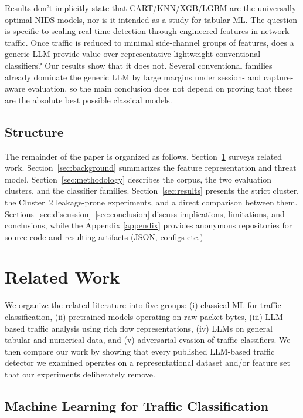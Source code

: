 \documentclass[conference]{IEEEtran}
\begin{document}
Results don't implicitly state that CART/KNN/XGB/LGBM are the universally optimal NIDS models, nor is it intended as a study for tabular ML. The question is specific to scaling real-time detection through engineered features in network traffic. Once traffic is reduced to  minimal side-channel groups of features, does a generic LLM provide value over representative lightweight conventional classifiers? Our results show that it does not. Several conventional families already dominate the generic LLM by large margins under session- and capture-aware evaluation, so the main conclusion does not depend on proving that these are the absolute best possible classical models.

\subsection{Structure}
The remainder of the paper is organized as follows. Section~\ref{sec:related} surveys related work. Section~\ref{sec:background} summarizes the feature representation and threat model. Section~\ref{sec:methodology} describes the corpus, the two evaluation clusters, and the classifier families. Section~\ref{sec:results} presents the strict cluster, the Cluster~2 leakage-prone experiments, and a direct comparison between them. Sections~\ref{sec:discussion}--\ref{sec:conclusion} discuss implications, limitations, and conclusions, while the Appendix \ref{appendix} provides anonymous repositories for source code and resulting artifacts (JSON, configs etc.)

\section{Related Work}
\label{sec:related}

We organize the related literature into five groups: (i) classical ML for traffic classification, (ii) pretrained models operating on raw packet bytes, (iii) LLM-based traffic analysis using rich flow representations, (iv) LLMs on general tabular and numerical data, and (v) adversarial evasion of traffic classifiers. We then compare our work by showing that every published LLM-based traffic detector we examined operates on a representational dataset and/or feature set that our experiments deliberately remove.

\subsection{Machine Learning for Traffic Classification}
\end{document}
